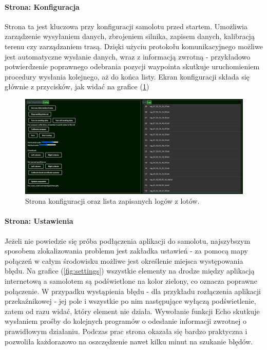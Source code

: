 \documentclass[12pt, a4paper]{article}
\let\oldref\ref
\renewcommand{\ref}[1]{(\oldref{#1})}
\begin{document}
\paragraph{Strona: Konfiguracja}\mbox{}

Strona ta jest kluczowa przy konfiguracji samolotu przed startem. Umożliwia zarządzenie wysyłaniem danych, zbrojeniem silnika, zapisem danych, kalibracją terenu czy zarządzaniem trasą. Dzięki użyciu protokołu komunikacyjnego możliwe jest automatyczne wysłanie danych, wraz z informacją zwrotną - przykładowo potwierdzenie poprawnego odebrania pozycji waypointa skutkuje uruchomieniem procedury wysłania kolejnego, aż do końca listy. Ekran konfiguracji składa się głównie z przycisków, jak widać na grafice \ref{fig:konlog}

 \begin{figure}[H]
    \centering
    \includegraphics[width=1\textwidth]{config}
    \caption{Strona konfiguracji oraz lista zapisanych logów z lotów.}
    \label{fig:konlog}
\end{figure}

\paragraph{Strona: Ustawienia}\mbox{}

Jeżeli nie powiedzie się próba podłączenia aplikacji do samolotu, najszybszym sposobem zlokalizowania problemu jest zakładka ustawień - za pomocą mapy połączeń w całym środowisku możliwe jest określenie miejsca występowania błędu. Na grafice \ref{fig:settings} wszystkie elementy na drodze między aplikacją internetową a samolotem są podświetlone na kolor zielony, co oznacza poprawne połączenie. W przypadku wystąpienia błędu - dla przykładu rozłączenia aplikacji przekaźnikowej - jej pole i wszystkie po nim następujące wyłączą podświetlenie, zatem od razu widać, który element nie działa. Wywołanie funkcji Echo skutkuje wysłaniem prośby do kolejnych programów o odesłanie informacji zwrotnej o prawidłowym działaniu. Podczas prac strona okazała się bardzo praktyczna i pozwoliła każdorazowo na oszczędzenie nawet kilku minut na szukanie błędów. 
\end{document}
